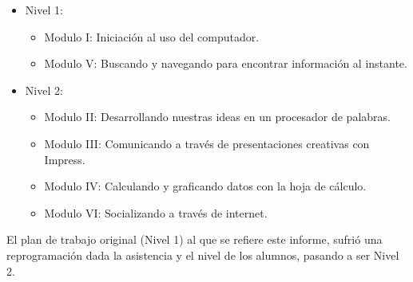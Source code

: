                 \begin{itemize}
                    \item Nivel 1:
                    \begin{itemize}
                        \item Modulo I: Iniciación al uso del computador.
                        \item Modulo V: Buscando y navegando para encontrar información al instante.
                    \end{itemize}
                    \item Nivel 2:
                    \begin{itemize}
                        \item Modulo II: Desarrollando nuestras ideas en un procesador de palabras.
                        \item Modulo III: Comunicando a través de presentaciones creativas con Impress.
                        \item Modulo IV: Calculando y graficando datos con la hoja de cálculo.
                        \item Modulo VI: Socializando a través de internet.
                    \end{itemize}
                \end{itemize}
                
            
            El plan de trabajo original (Nivel 1) al que se refiere este informe, sufrió una reprogramación dada la asistencia y el nivel de los alumnos, pasando a ser Nivel 2.
            
